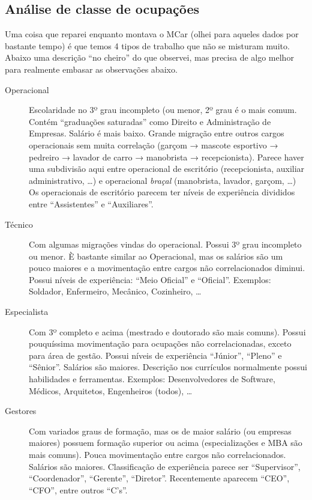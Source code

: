 \documentclass[12pt,a4paper]{article}
\theoremstyle{hypo}
\begin{document}
\subsection{Análise de classe de ocupações}

Uma coisa que reparei enquanto montava o MCar (olhei para aqueles dados por bastante tempo) é que temos 4 tipos de trabalho que não se misturam muito. Abaixo uma descrição \enquote{no cheiro} do que observei, mas precisa de algo melhor para realmente embasar as observações abaixo.


\begin{description}
\item [Operacional] Escolaridade no 3º grau incompleto (ou menor, 2º grau é o mais comum. Contém \enquote{graduações saturadas} como Direito e Administração de Empresas. Salário é mais baixo. Grande migração entre outros cargos operacionais sem muita correlação (garçom → mascote esportivo → pedreiro → lavador de carro → manobrista → recepcionista). Parece haver uma subdivisão aqui entre operacional de escritório (recepcionista, auxiliar administrativo, \ldots) e operacional \textit{braçal} (manobrista, lavador, garçom, \ldots) Os operacionais de escritório parecem ter níveis de experiência divididos entre \enquote{Assistentes} e \enquote{Auxiliares}.
\item [Técnico] Com algumas migrações vindas do operacional. Possui 3º grau incompleto ou menor. È bastante similar ao Operacional, mas os salários são um pouco maiores e a movimentação entre cargos não correlacionados diminui. Possui níveis de experiência: \enquote{Meio Oficial} e \enquote{Oficial}. Exemplos: Soldador, Enfermeiro, Mecânico, Cozinheiro, \ldots
\item [Especialista] Com 3º completo e acima (mestrado e doutorado são mais comuns). Possui pouquíssima movimentação para ocupações não correlacionadas, exceto para área de gestão. Possui níveis de experiência \enquote{Júnior}, \enquote{Pleno} e \enquote{Sênior}. Salários são maiores. Descrição nos currículos normalmente possui habilidades e ferramentas. Exemplos: Desenvolvedores de Software, Médicos, Arquitetos, Engenheiros (todos), \ldots
\item [Gestores] Com variados graus de formação, mas os de maior salário (ou empresas maiores) possuem formação superior ou acima (especializações e MBA são mais comuns). Pouca movimentação entre cargos não correlacionados. Salários são maiores. Classificação de experiência parece ser \enquote{Supervisor}, \enquote{Coordenador}, \enquote{Gerente}, \enquote{Diretor}. Recentemente aparecem \enquote{CEO}, \enquote{CFO}, entre outros \enquote{C's}.
\end{description}
\end{document}
